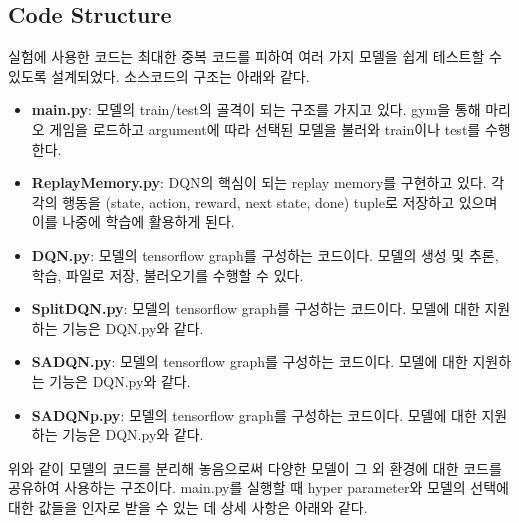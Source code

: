 \subsection{Code Structure}
\label{sec:dev:code}
실험에 사용한 코드는 최대한 중복 코드를 피하여 여러 가지 모델을 쉽게 테스트할 수 있도록 설계되었다.
소스코드의 구조는 아래와 같다.
%
\begin{itemize}
	\item \textbf{main.py}:
		모델의 train/test의 골격이 되는 구조를 가지고 있다. gym을 통해 마리오 게임을 로드하고 argument에 따라 선택된 모델을 불러와 train이나 test를 수행한다.
	\item \textbf{ReplayMemory.py}:
		DQN의 핵심이 되는 replay memory를 구현하고 있다.
		각각의 행동을 (state, action, reward, next state, done) tuple로 저장하고 있으며 이를 나중에 학습에 활용하게 된다.
	\item \textbf{DQN.py}:
		\dqn 모델의 tensorflow graph를 구성하는 코드이다.
		모델의 생성 및 추론, 학습, 파일로 저장, 불러오기를 수행할 수 있다.
	\item \textbf{SplitDQN.py}:
		\sdqn 모델의 tensorflow graph를 구성하는 코드이다.
		모델에 대한 지원하는 기능은 DQN.py와 같다.
	\item \textbf{SADQN.py}:
		\sadqn 모델의 tensorflow graph를 구성하는 코드이다.
		모델에 대한 지원하는 기능은 DQN.py와 같다.
	\item \textbf{SADQNp.py}:
		\sapdqn 모델의 tensorflow graph를 구성하는 코드이다.
		모델에 대한 지원하는 기능은 DQN.py와 같다.
\end{itemize}
%
위와 같이 모델의 코드를 분리해 놓음으로써 다양한 모델이 그 외 환경에 대한 코드를 공유하여 사용하는 구조이다.
main.py를 실행할 때 hyper parameter와 모델의 선택에 대한 값들을 인자로 받을 수 있는 데 상세 사항은 아래와 같다.
%
